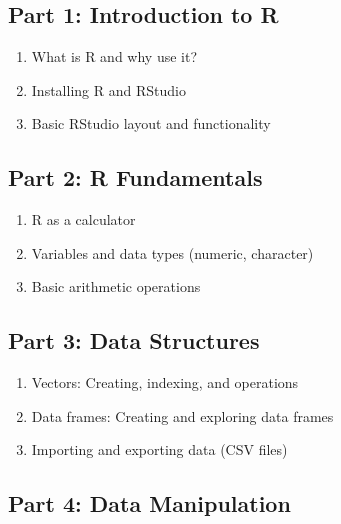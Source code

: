 \documentclass[
]{book}
\providecommand{\tightlist}{%
  \setlength{\itemsep}{0pt}\setlength{\parskip}{0pt}}
\begin{document}
\subsection*{Part 1: Introduction to R}\label{part-1-introduction-to-r}

\begin{enumerate}
\def\labelenumi{\arabic{enumi}.}
\tightlist
\item
  What is R and why use it?
\item
  Installing R and RStudio
\item
  Basic RStudio layout and functionality
\end{enumerate}

\subsection*{Part 2: R Fundamentals}\label{part-2-r-fundamentals}

\begin{enumerate}
\def\labelenumi{\arabic{enumi}.}
\tightlist
\item
  R as a calculator
\item
  Variables and data types (numeric, character)
\item
  Basic arithmetic operations
\end{enumerate}

\subsection*{Part 3: Data Structures}\label{part-3-data-structures}

\begin{enumerate}
\def\labelenumi{\arabic{enumi}.}
\tightlist
\item
  Vectors: Creating, indexing, and operations
\item
  Data frames: Creating and exploring data frames
\item
  Importing and exporting data (CSV files)
\end{enumerate}

\subsection*{Part 4: Data Manipulation}\label{part-4-data-manipulation}
\end{document}
